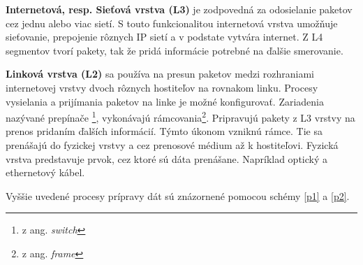 \textbf{Internetová, resp. Sieťová vrstva (L3)} je zodpovedná za odosielanie paketov cez jednu alebo viac sietí. S touto funkcionalitou internetová vrstva umožňuje sieťovanie, prepojenie rôznych IP sietí a v podstate vytvára internet. Z L4 segmentov tvorí pakety, tak že pridá informácie potrebné na ďalšie smerovanie. 

\textbf{Linková vrstva (L2)} sa používa na presun paketov medzi rozhraniami internetovej vrstvy dvoch rôznych hostiteľov na rovnakom linku. Procesy vysielania a prijímania paketov na linke je možné konfigurovať. Zariadenia nazývané prepínače \footnote{z ang. \textit{switch}}, vykonávajú rámcovania\footnote{z ang. \textit{frame}}. Pripravujú pakety z L3 vrstvy na prenos pridaním ďalších informácií. Týmto úkonom vzniknú rámce. Tie sa prenášajú do fyzickej vrstvy a cez prenosové médium až k hostiteľovi. Fyzická vrstva predstavuje prvok, cez ktoré sú dáta prenášane. Napríklad optický a ethernetový kábel. 

Vyššie uvedené procesy prípravy dát sú znázornené pomocou schémy \ref{p1} a \ref{p2}.


